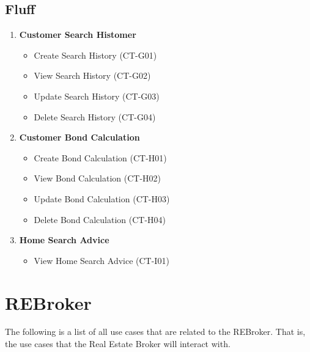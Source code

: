 \documentclass[11pt]{article}
\begin{document}
		\subsection{Fluff}
			\begin{enumerate}[i]
				\item \textbf{Customer Search Histomer}
				\begin{itemize}
					\item Create Search History (CT-G01)
					\item View Search History (CT-G02)
					\item Update Search History (CT-G03)
					\item Delete Search History (CT-G04)
				\end{itemize}
				
				\item \textbf{Customer Bond Calculation}
				\begin{itemize}
					\item Create Bond Calculation (CT-H01)
					\item View Bond Calculation (CT-H02)
					\item Update Bond Calculation (CT-H03)
					\item Delete Bond Calculation (CT-H04)
				\end{itemize}
				
				\item \textbf{Home Search Advice}
				\begin{itemize}
					\item View Home Search Advice (CT-I01)
				\end{itemize}
			\end{enumerate}
		

	\section{REBroker}
	\begin{flushleft}
		The following is a list of all use cases that are related to the REBroker. That is, the use cases that the Real Estate Broker will interact with.
	\end{flushleft}
		
\end{document}
